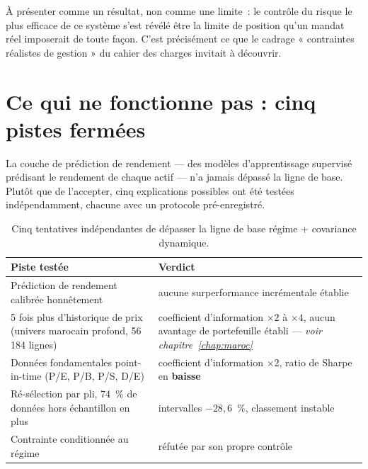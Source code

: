 \begin{remarquebox}
À présenter comme un résultat, non comme une limite~: le contrôle du risque le
plus efficace de ce système s'est révélé être la limite de position qu'un mandat
réel imposerait de toute façon. C'est précisément ce que le cadrage
« contraintes réalistes de gestion » du cahier des charges invitait à découvrir.
\end{remarquebox}

\section{Ce qui ne fonctionne pas : cinq pistes fermées}

La couche de prédiction de rendement — des modèles d'apprentissage supervisé
prédisant le rendement de chaque actif — n'a jamais dépassé la ligne de base.
Plutôt que de l'accepter, cinq explications possibles ont été testées
indépendamment, chacune avec un protocole pré-enregistré.

\begin{table}[htbp]
  \centering
  \caption[Les cinq pistes testées]{Cinq tentatives indépendantes de dépasser la
  ligne de base régime + covariance dynamique.}
  \label{tab:cinq-pistes}
  \small
  \begin{tabular}{p{7.4cm}p{7.2cm}}
    \toprule
    Piste testée & Verdict \\
    \midrule
    Prédiction de rendement calibrée honnêtement & aucune surperformance incrémentale établie \\
    5 fois plus d'historique de prix (univers marocain profond, 56\,184 lignes) &
      coefficient d'information $\times 2$ à $\times 4$, aucun avantage de
      portefeuille établi --- \emph{voir chapitre~\ref{chap:maroc}} \\
    Données fondamentales point-in-time (P/E, P/B, P/S, D/E) &
      coefficient d'information $\times 2$, ratio de Sharpe en \textbf{baisse} \\
    Ré-sélection par pli, 74~\% de données hors échantillon en plus &
      intervalles $-28{,}6$~\%, classement instable \\
    Contrainte conditionnée au régime & réfutée par son propre contrôle \\
    \bottomrule
  \end{tabular}
\end{table}

